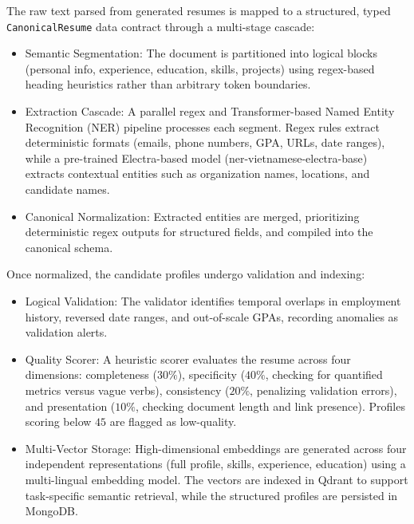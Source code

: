 \documentclass[12pt, a4paper]{report}
\begin{document}
The raw text parsed from generated resumes is mapped to a structured, typed \texttt{CanonicalResume} data contract through a multi-stage cascade:
\begin{itemize}
    \item Semantic Segmentation: The document is partitioned into logical blocks (personal info, experience, education, skills, projects) using regex-based heading heuristics rather than arbitrary token boundaries.
    \item Extraction Cascade: A parallel regex and Transformer-based Named Entity Recognition (NER) pipeline processes each segment. Regex rules extract deterministic formats (emails, phone numbers, GPA, URLs, date ranges), while a pre-trained Electra-based model (ner-vietnamese-electra-base) extracts contextual entities such as organization names, locations, and candidate names.
    \item Canonical Normalization: Extracted entities are merged, prioritizing deterministic regex outputs for structured fields, and compiled into the canonical schema.
\end{itemize}

\vspace{0.3cm}

Once normalized, the candidate profiles undergo validation and indexing:
\begin{itemize}
    \item Logical Validation: The validator identifies temporal overlaps in employment history, reversed date ranges, and out-of-scale GPAs, recording anomalies as validation alerts.
    \item Quality Scorer: A heuristic scorer evaluates the resume across four dimensions: completeness ($30\%$), specificity ($40\%$, checking for quantified metrics versus vague verbs), consistency ($20\%$, penalizing validation errors), and presentation ($10\%$, checking document length and link presence). Profiles scoring below $45$ are flagged as low-quality.
    \item Multi-Vector Storage: High-dimensional embeddings are generated across four independent representations (full profile, skills, experience, education) using a multi-lingual embedding model. The vectors are indexed in Qdrant to support task-specific semantic retrieval, while the structured profiles are persisted in MongoDB.
\end{itemize}
\end{document}
